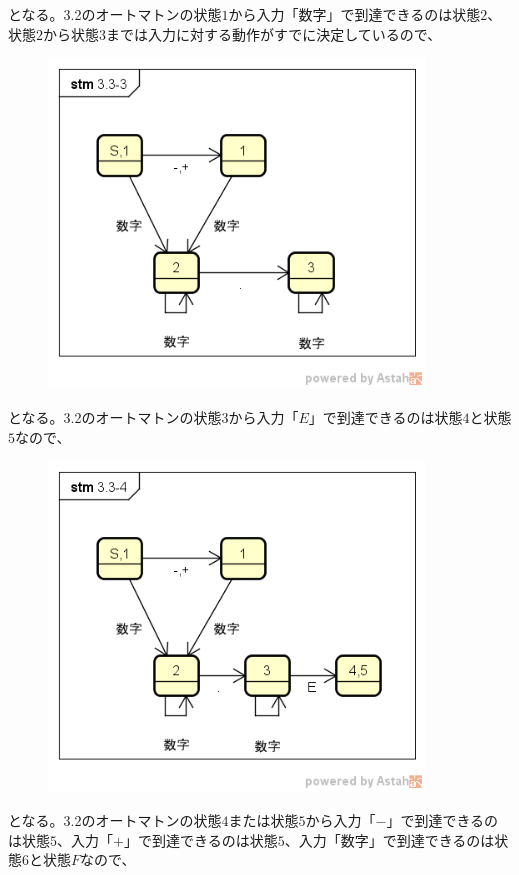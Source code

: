 \documentclass[a4paper,12pt]{jarticle}
\begin{document}
となる。3.2のオートマトンの状態$ 1 $から入力「$ 数字 $」で到達できるのは状態$ 2 $、状態$ 2 $から状態$ 3 $までは入力に対する動作がすでに決定しているので、
\begin{figure}[H]
 \begin{center}
  \includegraphics[width=10cm]{Automatonfig/3-3-3.png}
 \end{center}
\end{figure}
となる。3.2のオートマトンの状態$ 3 $から入力「$ E $」で到達できるのは状態$ 4 $と状態$ 5 $なので、
\begin{figure}[H]
 \begin{center}
  \includegraphics[width=10cm]{Automatonfig/3-3-4.png}
 \end{center}
\end{figure}
となる。3.2のオートマトンの状態$ 4 $または状態$ 5 $から入力「$ - $」で到達できるのは状態$ 5 $、入力「$ + $」で到達できるのは状態$ 5 $、入力「$ 数字 $」で到達できるのは状態$ 6 $と状態$ F $なので、
\end{document}
